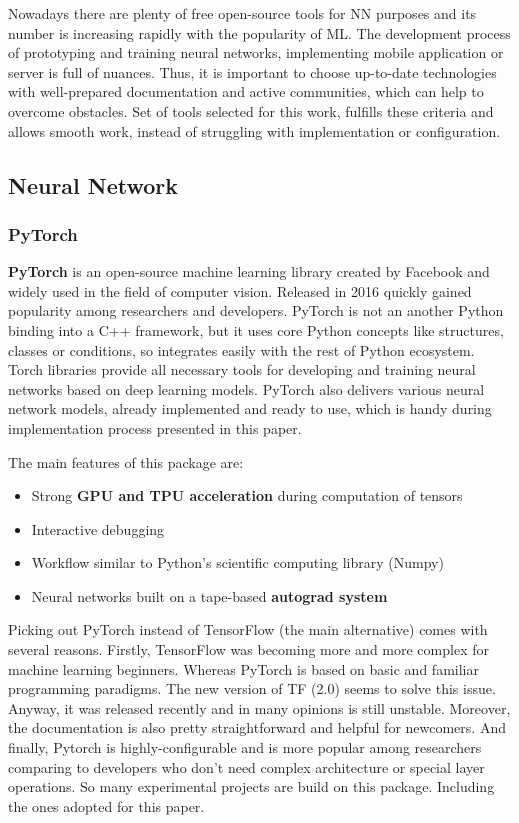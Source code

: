 \documentclass[../Main.tex]{subfiles}
\begin{document}
Nowadays there are plenty of free open-source tools for NN purposes and its number is increasing rapidly with the popularity of ML. The development process of prototyping and training neural networks, implementing mobile application or server is full of nuances. Thus, it is  important to choose up-to-date technologies with well-prepared documentation and active communities, which can help to overcome obstacles. Set of tools selected for this work, fulfills these criteria and allows smooth work, instead of struggling with implementation or configuration.

\subsection{Neural Network}

    \subsubsection{PyTorch}
    \textbf{PyTorch} is an open-source machine learning library created by Facebook and widely used in the field of computer vision. Released in 2016 \cite{pytorch} quickly gained popularity among researchers and developers. PyTorch is not an another Python binding into a C++ framework, but it uses core Python concepts like structures, classes or conditions, so integrates easily with the rest of Python ecosystem. Torch libraries provide all necessary tools for developing and training neural networks based on deep learning models. PyTorch also delivers various neural network models, already implemented and ready to use, which is handy during implementation process presented in this paper.
    
    The main features of this package are:
    \begin{itemize}
        \item Strong \textbf{GPU and TPU acceleration} during computation of tensors
        \item Interactive debugging 
        \item Workflow similar to Python’s scientific computing library (Numpy)
        \item Neural networks built on a tape-based \textbf{autograd system}
    \end{itemize}
    
    Picking out PyTorch instead of TensorFlow (the main alternative) comes with several reasons. Firstly, TensorFlow was becoming more and more complex for machine learning beginners. Whereas PyTorch is based on basic and familiar programming paradigms. The new version of TF (2.0) seems to solve this issue. Anyway, it was released recently and in many opinions is still unstable. Moreover, the documentation is also pretty straightforward and helpful for newcomers. And finally, Pytorch is highly-configurable and is more popular among researchers comparing to developers who don’t need complex architecture or special layer operations. So many experimental projects are build on this package. Including the ones adopted for this paper. 
    
\end{document}
